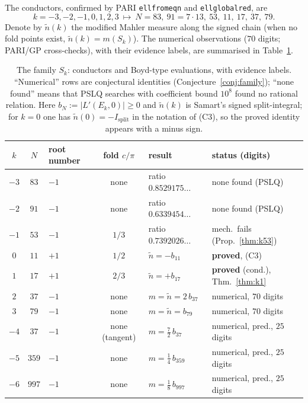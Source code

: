 \documentclass[preprint,12pt]{elsarticle}
\theoremstyle{definition}
\theoremstyle{remark}
\begin{document}
The conductors, confirmed by PARI \cite{PARI}
\texttt{ellfromeqn} and \texttt{ellglobalred}, are
\[
  k=-3,-2,-1,0,1,2,3\ \longmapsto\ N=83,\ 91=7\cdot13,\ 53,\ 11,\ 17,\ 37,\ 79.
\]
Denote by $\tilde n(k)$ the modified Mahler measure along the signed chain
(when no fold points exist, $\tilde n(k)=m(S_k)$). The numerical
observations ($70$ digits; PARI/GP cross-checks), with their evidence
labels, are summarised in Table~\ref{tab:family}.

\begin{table}[ht]
\centering\footnotesize
\begin{tabular}{@{}cclcll@{}}
\toprule
$k$ & $N$ & root number & fold $c/\pi$ & result & status (digits)\\
\midrule
$-3$ & $83$ & $-1$ & none & ratio $0.8529175\ldots$ & none found (PSLQ)\\
$-2$ & $91$ & $-1$ & none & ratio $0.6339454\ldots$ & none found (PSLQ)\\
$-1$ & $53$ & $-1$ & $1/3$ & ratio $0.7392026\ldots$ & mech.\ fails
  (Prop.~\ref{thm:k53})\\
$0$ & $11$ & $+1$ & $1/2$ & $\tilde n=-b_{11}$ & \textbf{proved}, (C3)\\
$1$ & $17$ & $+1$ & $2/3$ & $\tilde n=+b_{17}$ & \textbf{proved} (cond.),
  Thm.~\ref{thm:k1}\\
$2$ & $37$ & $-1$ & none & $m=\tilde n=2\,b_{37}$ & numerical, $70$ digits\\
$3$ & $79$ & $-1$ & none & $m=\tilde n=b_{79}$ & numerical, $70$ digits\\
$-4$ & $37$ & $-1$ & none (tangent) & $m=\tfrac72\,b_{37}$
  & numerical, pred., $25$ digits\\
$-5$ & $359$ & $-1$ & none & $m=\tfrac14\,b_{359}$
  & numerical, pred., $25$ digits\\
$-6$ & $997$ & $-1$ & none & $m=\tfrac18\,b_{997}$
  & numerical, pred., $25$ digits\\
\bottomrule
\end{tabular}
\caption{The family $S_k$: conductors and Boyd-type evaluations, with
evidence labels. ``Numerical'' rows are conjectural identities
(Conjecture~\ref{conj:family}); ``none found'' means that PSLQ searches
with coefficient bound $10^8$ found no rational relation.
Here $b_N:=|L'(E_k,0)|\ge0$ and $\tilde n(k)$ is Samart's signed
split-integral; for $k=0$ one has $\tilde n(0)=-I_{\mathrm{split}}$ in the
notation of \textup{(C3)}, so the proved identity appears with a minus sign.}
\label{tab:family}
\end{table}
\end{document}

